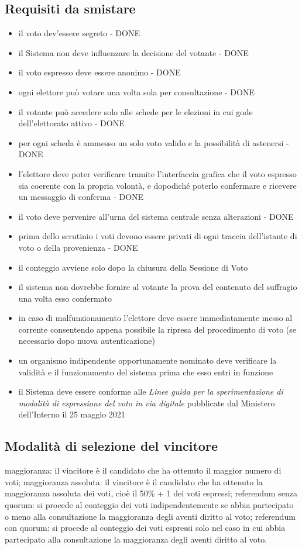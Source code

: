 \documentclass{report}
\begin{document}
\subsection{Requisiti da smistare}
\begin{itemize}
	\item il voto dev'essere segreto - DONE
	\item il Sistema non deve influenzare la decisione del votante - DONE
	\item il voto espresso deve essere anonimo - DONE
	\item ogni elettore può votare una volta sola per consultazione - DONE
	\item il votante può accedere solo alle schede per le elezioni in cui gode dell'elettorato attivo - DONE
	\item per ogni scheda è ammesso un solo voto valido e la possibilità di astenersi - DONE
	\item l'elettore deve poter verificare tramite l'interfaccia grafica che il voto espresso sia coerente con la propria volontà, e dopodiché poterlo confermare e ricevere un messaggio di conferma - DONE
	\item il voto deve pervenire all'urna del sistema centrale senza alterazioni - DONE
	\item prima dello scrutinio i voti devono essere privati di ogni traccia dell'istante di voto o della provenienza - DONE
	\item il conteggio avviene solo dopo la chiusura della Sessione di Voto
	\item il sistema non dovrebbe fornire al votante la prova del contenuto del suffragio una volta esso confermato
	\item in caso di malfunzionamento l'elettore deve essere immediatamente messo al corrente consentendo appena possibile la ripresa del procedimento di voto (se necessario dopo nuova autenticazione)
	\item un organismo indipendente opportunamente nominato deve verificare la validità e il funzionamento del sistema prima che esso entri in funzione
	\item il Sistema deve essere conforme alle \textit{Linee  guida  per  la  sperimentazione  di  modalità  di  espressione  del  voto  in  via digitale} pubblicate dal Ministero dell'Interno il 25 maggio 2021
\end{itemize}


\subsection{Modalità di selezione del vincitore}
	maggioranza: il vincitore è il candidato che ha ottenuto il maggior numero di voti;
	maggioranza assoluta: il vincitore è il candidato che ha ottenuto la maggioranza assoluta dei voti, cioè il 50\% + 1 dei voti espressi;
	referendum senza quorum: si procede al conteggio dei voti indipendentemente se abbia partecipato o meno alla consultazione la maggioranza degli aventi diritto al voto; 
	referendum con quorum: si procede al conteggio dei voti espressi solo nel caso in cui abbia partecipato alla consultazione la maggioranza degli aventi diritto al voto.
\end{document}
